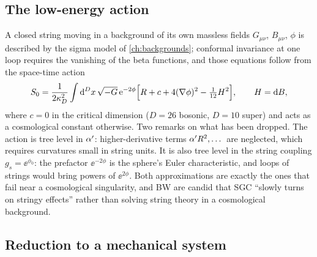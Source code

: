 \subsection{The low-energy action}

A closed string moving in a background of its own massless fields $G_{\mu\nu}$, $B_{\mu\nu}$,
$\phi$ is described by the sigma model of \cref{ch:backgrounds}; conformal invariance at one
loop requires the vanishing of the beta functions, and those equations follow from the
space-time action 
\begin{equation}\label{eq:cosmology:S0}
 S_0=\frac{1}{2\kappa_D^2}\int\mathrm{d}^Dx\,\sqrt{-G}\,\mathrm{e}^{-2\phi}\Bigl[R+c+4(\nabla\phi)^2-\tfrac1{12}H^2\Bigr],
 \qquad H=\mathrm{d} B,
\end{equation}
where $c=0$ in the critical dimension ($D=26$ bosonic, $D=10$ super) and acts as a
cosmological constant otherwise. Two remarks on what has been dropped. The action is tree
level in $\alpha'$: higher-derivative terms $\alpha' R^2,\dots$ are neglected, which requires
curvatures small in string units. It is also tree level in the string coupling
$g_s=\ee^{\phi_0}$: the prefactor $\ee^{-2\phi}$ is the sphere's Euler characteristic, and
loops of strings would bring powers of $\ee^{2\phi}$.  Both
approximations are exactly the ones that fail near a cosmological singularity, and BW are
candid that SGC ``slowly turns on stringy effects'' rather than solving string theory in a
cosmological background. 

\subsection{Reduction to a mechanical system}

